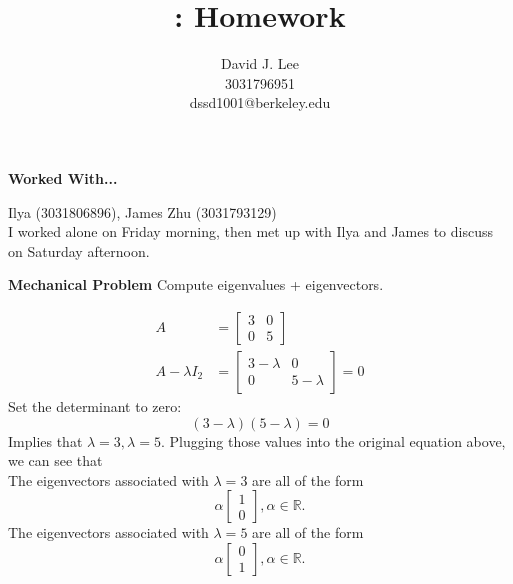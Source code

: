 \documentclass[letter]{article}
\title{\class: Homework \hwn}
\author{David J. Lee\\3031796951\\dssd1001@berkeley.edu}
\newenvironment{menumerate}{\edef\backupindent{\the\parindent}
  \enumerate\setlength{\parindent}{\backupindent}}
  {\endenumerate}
\begin{document}
\maketitle
\thispagestyle{empty}

\begin{menumerate}
    \item \textbf{Worked With...}

    Ilya (3031806896), James Zhu (3031793129)\\
    I worked alone on Friday morning, then met up with Ilya and James to discuss on Saturday afternoon.

    \newpage
    \item \textbf{Mechanical Problem} Compute eigenvalues + eigenvectors.
    \begin{menumerate}
        \item
        \begin{equation*}
        \begin{aligned}
        A &=
            \begin{bmatrix}
                3&0\\
                0&5
            \end{bmatrix}\\
        A - \lambda I_2 &=
            \begin{bmatrix}
                3-\lambda&0\\
                0&5-\lambda
            \end{bmatrix} = 0
        \end{aligned}
        \end{equation*}
        Set the determinant to zero:
        \begin{equation*}
            (3 - \lambda)(5 - \lambda) = 0
        \end{equation*}
        Implies that $\lambda = 3, \lambda = 5$. Plugging those values into the original equation above, we can see that\\
        The eigenvectors associated with $\lambda = 3$ are all of the form
        \begin{equation*}
            \alpha \begin{bmatrix}1\\0\end{bmatrix}, \alpha \in \mathbb{R} .
        \end{equation*}
        The eigenvectors associated with $\lambda = 5$ are all of the form
        \begin{equation*}
            \alpha \begin{bmatrix}0\\1\end{bmatrix}, \alpha \in \mathbb{R} .
        \end{equation*}


\end{menumerate}
\end{menumerate}
\end{document}
